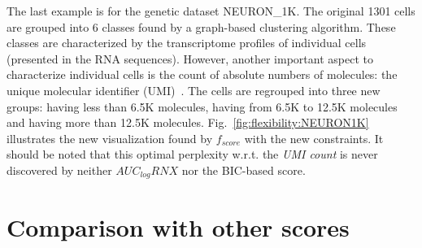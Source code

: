The last example is for the genetic dataset NEURON\_1K.
The original 1301 cells are grouped into 6 classes found by a graph-based clustering algorithm.
These classes are characterized by the transcriptome profiles of individual cells (presented in the RNA sequences).
However, another important aspect to characterize individual cells is the count of absolute numbers of molecules: the unique molecular identifier (UMI)~\cite{kivioja2011counting}. 
The cells are regrouped into three new groups: having less than 6.5K molecules, having from 6.5K to 12.5K molecules and having more than 12.5K molecules.
Fig.~\ref{fig:flexibility:NEURON1K} illustrates the new visualization found by $f_{score}$ with the new constraints.
It should be noted that this optimal perplexity w.r.t. the \emph{UMI count} is never discovered by neither $AUC_{log}RNX$ nor the BIC-based score.

\section{Comparison with other scores}\label{sec:compare}

